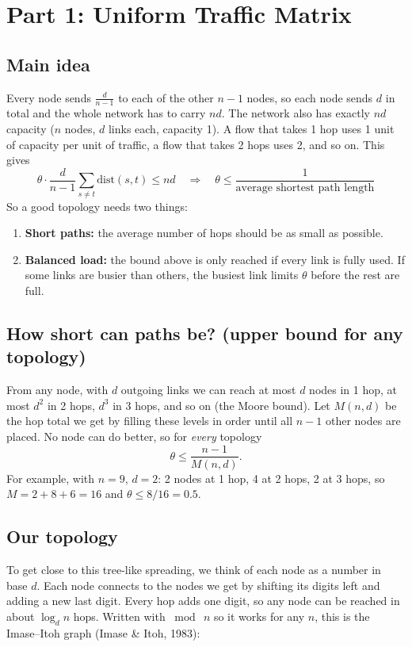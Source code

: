 \section{Part 1: Uniform Traffic Matrix}

\subsection*{Main idea}

Every node sends $\frac{d}{n-1}$ to each of the other $n-1$ nodes, so each node sends $d$ in total
and the whole network has to carry $nd$. The network also has exactly $nd$ capacity ($n$ nodes,
$d$ links each, capacity 1). A flow that takes 1 hop uses 1 unit of capacity per unit of traffic, a
flow that takes 2 hops uses 2, and so on. This gives
\[
\theta \cdot \frac{d}{n-1} \sum_{s \neq t} \text{dist}(s,t) \le nd
\quad\Longrightarrow\quad
\theta \le \frac{1}{\text{average shortest path length}}
\]
So a good topology needs two things:
\begin{enumerate}
  \item \textbf{Short paths:} the average number of hops should be as small as possible.
  \item \textbf{Balanced load:} the bound above is only reached if every link is fully used. If
        some links are busier than others, the busiest link limits $\theta$ before the rest are full.
\end{enumerate}

\subsection*{How short can paths be? (upper bound for any topology)}

From any node, with $d$ outgoing links we can reach at most $d$ nodes in 1 hop, at most $d^2$ in
2 hops, $d^3$ in 3 hops, and so on (the Moore bound). Let $M(n,d)$ be the hop total we get by filling
these levels in order until all $n-1$ other nodes are placed. No node can do better, so for
\emph{every} topology
\[
\theta \le \frac{n-1}{M(n,d)}.
\]
For example, with $n = 9$, $d = 2$: 2 nodes at 1 hop, 4 at 2 hops, 2 at 3 hops, so
$M = 2 + 8 + 6 = 16$ and $\theta \le 8/16 = 0.5$.

\subsection*{Our topology}

To get close to this tree-like spreading, we think of each node as a number in base $d$. Each node
connects to the nodes we get by shifting its digits left and adding a new last digit. Every hop adds
one digit, so any node can be reached in about $\log_d n$ hops. Written with $\bmod\ n$ so it works
for any $n$, this is the Imase--Itoh graph (Imase \& Itoh, 1983):

